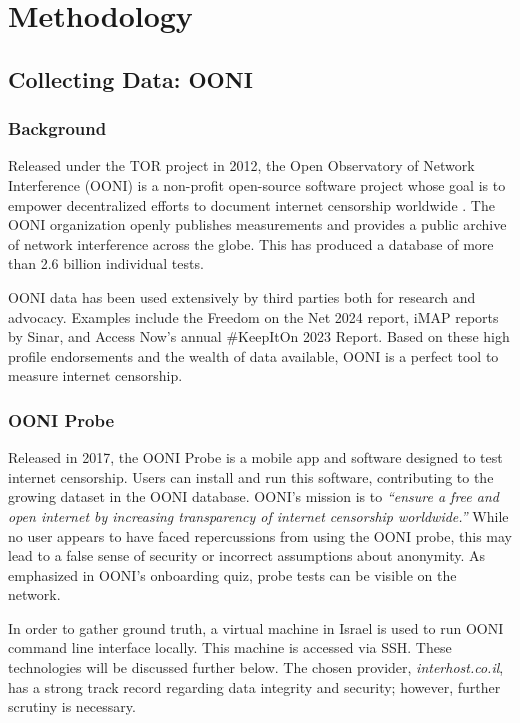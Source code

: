 \chapter{Methodology}

\section{Collecting Data: OONI}

\subsection{Background}
Released under the TOR project in 2012, the Open Observatory of Network Interference (OONI) is a non-profit open-source software project whose goal is to empower decentralized efforts to document internet censorship worldwide \cite{OONIAbout}. The OONI organization openly publishes measurements and provides a public archive of network interference across the globe. This has produced a database of more than 2.6 billion individual tests. \cite{OONIExplorer}

OONI data has been used extensively by third parties both for research and advocacy. Examples include the Freedom on the Net 2024 \cite{freedomhouse2024struggle} report, iMAP reports \cite{ooni2024imap} by Sinar, and Access Now’s annual #KeepItOn 2023 Report. \cite{accessnow2023keepiton} \cite{ooni2024yearinreview} Based on these high profile endorsements and the wealth of data available, OONI is a perfect tool to measure internet censorship.

\subsection{OONI Probe}
Released in 2017, the OONI Probe is a mobile app and software designed to test internet censorship. Users can install and run this software, contributing to the growing dataset in the OONI database. OONI's mission is to \textit{“ensure a free and open internet by increasing transparency of internet censorship worldwide.”} While no user appears to have faced repercussions from using the OONI probe, this may lead to a false sense of security or incorrect assumptions about anonymity. As emphasized in OONI’s onboarding quiz, probe tests can be visible on the network.

In order to gather ground truth, a virtual machine in Israel is used to run OONI command line interface locally. This machine is accessed via SSH. These technologies will be discussed further below. The chosen provider, \textit{interhost.co.il}, has a strong track record regarding data integrity and security; however, further scrutiny is necessary. \cite{interhost} 

